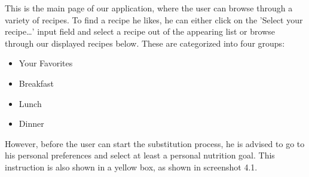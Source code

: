 This is the main page of our application, where the user can browse through a variety of recipes. To find a recipe he likes, he can either click on the 'Select your recipe…' input field and select a recipe out of the appearing list or browse through our displayed recipes below. These are categorized into four groups:
\begin{itemize}
\item Your Favorites
\item Breakfast
\item Lunch
\item Dinner
\end{itemize}	
However, before the user can start the substitution process, he is advised to go to his personal preferences and select at least a personal nutrition goal. This instruction is also shown in a yellow box, as shown in screenshot 4.1.
